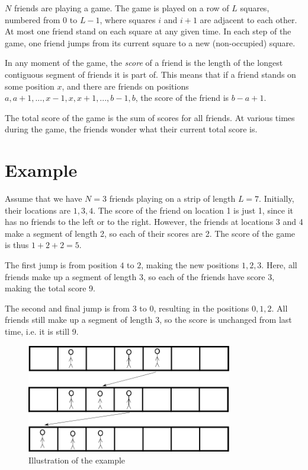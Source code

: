 \newcommand\version{v1}
$N$ friends are playing a game. The game is played on a row of $L$ squares, numbered from $0$ to $L - 1$, where squares $i$ and $i+1$ are adjacent to each other. At most one friend stand on each square
at any given time. In each step of the game, one friend jumps from its current square to a new (non-occupied) square.

In any moment of the game, the \emph{score} of a friend is the length of the longest contiguous segment
of friends it is part of. This means that if a friend stands on some position $x$, and there are friends
on positions $a, a + 1, ..., x - 1, x, x + 1, ..., b - 1, b$, the score of the friend is $b - a + 1$.

The total score of the game is the sum of scores for all friends. At various times during the game, the friends wonder what their current total score is.

\section*{Example}
Assume that we have $N = 3$ friends playing on a strip of length $L = 7$. Initially,
their locations are $1, 3, 4$. The score of the friend on location 1 is just 1, since it has no friends
to the left or to the right. However, the friends at locations 3 and 4 make a segment of length 2, so
each of their scores are 2. The score of the game is thus $1 + 2 + 2 = 5$.

The first jump is from position $4$ to $2$, making the new positions $1, 2, 3$. Here, all friends
make up a segment of length 3, so each of the friends have score 3, making the total score 9.

The second and final jump is from $3$ to $0$, resulting in the positions $0, 1, 2$. All friends
still make up a segment of length 3, so the score is unchanged from last time, i.e. it is still 9.

\begin{figure}[h!]
  \centering
  \includegraphics[width=0.8\textwidth]{sample.png}
  \caption{Illustration of the example}
\end{figure}

